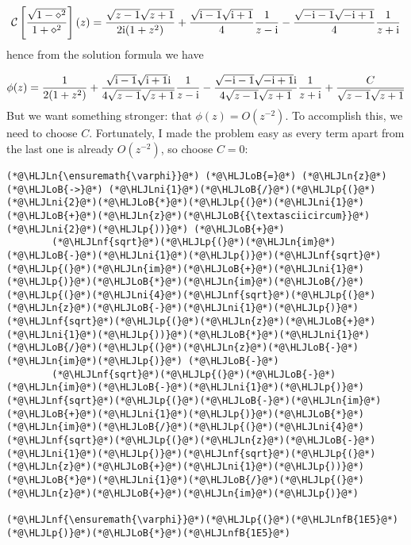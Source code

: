 \documentclass[12pt,a4paper]{article}
\newcommand{\HLJLn}[1]{#1}
\newcommand{\HLJLnf}[1]{\textcolor[RGB]{66,102,213}{#1}}
\newcommand{\HLJLnfB}[1]{\textcolor[RGB]{59,151,46}{#1}}
\newcommand{\HLJLni}[1]{\textcolor[RGB]{59,151,46}{#1}}
\newcommand{\HLJLoB}[1]{\textcolor[RGB]{102,102,102}{\textbf{#1}}}
\newcommand{\HLJLp}[1]{#1}
\def\I{ {\rm i} }
\def\CC{ {\cal C} }
\begin{document}
\[
\CC\left[{\sqrt{1-\diamond^2}\over 1 + \diamond^2}\right] (z) = {\sqrt{z-1} \sqrt{z+1}  \over 2\I(1 + z^2)}  + {\sqrt{\I -1} \sqrt{\I+1} \over 4} { 1 \over z - \I} - {\sqrt{-\I -1} \sqrt{-\I+1} \over 4} { 1 \over z + \I}
\]
hence from the solution formula we have

\[
\phi(z) = {1  \over 2(1 + z^2)}  + {\sqrt{\I -1} \sqrt{\I+1} \I \over 4\sqrt{z-1} \sqrt{z+1}} { 1 \over z - \I} - {\sqrt{-\I -1} \sqrt{-\I+1} \I \over 4\sqrt{z-1} \sqrt{z+1}} { 1 \over z + \I} + {C \over \sqrt{z-1} \sqrt{z+1}}
\]
But we want something stronger: that $\phi(z) = O(z^{-2})$. To accomplish this, we need to choose $C$.  Fortunately, I made the problem easy as every term apart from the last one is already $O(z^{-2})$, so choose $C = 0$:


\begin{lstlisting}
(*@\HLJLn{\ensuremath{\varphi}}@*) (*@\HLJLoB{=}@*) (*@\HLJLn{z}@*) (*@\HLJLoB{->}@*) (*@\HLJLni{1}@*)(*@\HLJLoB{/}@*)(*@\HLJLp{(}@*)(*@\HLJLni{2}@*)(*@\HLJLoB{*}@*)(*@\HLJLp{(}@*)(*@\HLJLni{1}@*)(*@\HLJLoB{+}@*)(*@\HLJLn{z}@*)(*@\HLJLoB{{\textasciicircum}}@*)(*@\HLJLni{2}@*)(*@\HLJLp{))}@*) (*@\HLJLoB{+}@*)
        (*@\HLJLnf{sqrt}@*)(*@\HLJLp{(}@*)(*@\HLJLn{im}@*)(*@\HLJLoB{-}@*)(*@\HLJLni{1}@*)(*@\HLJLp{)}@*)(*@\HLJLnf{sqrt}@*)(*@\HLJLp{(}@*)(*@\HLJLn{im}@*)(*@\HLJLoB{+}@*)(*@\HLJLni{1}@*)(*@\HLJLp{)}@*)(*@\HLJLoB{*}@*)(*@\HLJLn{im}@*)(*@\HLJLoB{/}@*)(*@\HLJLp{(}@*)(*@\HLJLni{4}@*)(*@\HLJLnf{sqrt}@*)(*@\HLJLp{(}@*)(*@\HLJLn{z}@*)(*@\HLJLoB{-}@*)(*@\HLJLni{1}@*)(*@\HLJLp{)}@*)(*@\HLJLnf{sqrt}@*)(*@\HLJLp{(}@*)(*@\HLJLn{z}@*)(*@\HLJLoB{+}@*)(*@\HLJLni{1}@*)(*@\HLJLp{))}@*)(*@\HLJLoB{*}@*)(*@\HLJLni{1}@*)(*@\HLJLoB{/}@*)(*@\HLJLp{(}@*)(*@\HLJLn{z}@*)(*@\HLJLoB{-}@*)(*@\HLJLn{im}@*)(*@\HLJLp{)}@*) (*@\HLJLoB{-}@*)
        (*@\HLJLnf{sqrt}@*)(*@\HLJLp{(}@*)(*@\HLJLoB{-}@*)(*@\HLJLn{im}@*)(*@\HLJLoB{-}@*)(*@\HLJLni{1}@*)(*@\HLJLp{)}@*)(*@\HLJLnf{sqrt}@*)(*@\HLJLp{(}@*)(*@\HLJLoB{-}@*)(*@\HLJLn{im}@*)(*@\HLJLoB{+}@*)(*@\HLJLni{1}@*)(*@\HLJLp{)}@*)(*@\HLJLoB{*}@*)(*@\HLJLn{im}@*)(*@\HLJLoB{/}@*)(*@\HLJLp{(}@*)(*@\HLJLni{4}@*)(*@\HLJLnf{sqrt}@*)(*@\HLJLp{(}@*)(*@\HLJLn{z}@*)(*@\HLJLoB{-}@*)(*@\HLJLni{1}@*)(*@\HLJLp{)}@*)(*@\HLJLnf{sqrt}@*)(*@\HLJLp{(}@*)(*@\HLJLn{z}@*)(*@\HLJLoB{+}@*)(*@\HLJLni{1}@*)(*@\HLJLp{))}@*)(*@\HLJLoB{*}@*)(*@\HLJLni{1}@*)(*@\HLJLoB{/}@*)(*@\HLJLp{(}@*)(*@\HLJLn{z}@*)(*@\HLJLoB{+}@*)(*@\HLJLn{im}@*)(*@\HLJLp{)}@*)

(*@\HLJLnf{\ensuremath{\varphi}}@*)(*@\HLJLp{(}@*)(*@\HLJLnfB{1E5}@*)(*@\HLJLp{)}@*)(*@\HLJLoB{*}@*)(*@\HLJLnfB{1E5}@*)
\end{lstlisting}
\end{document}
